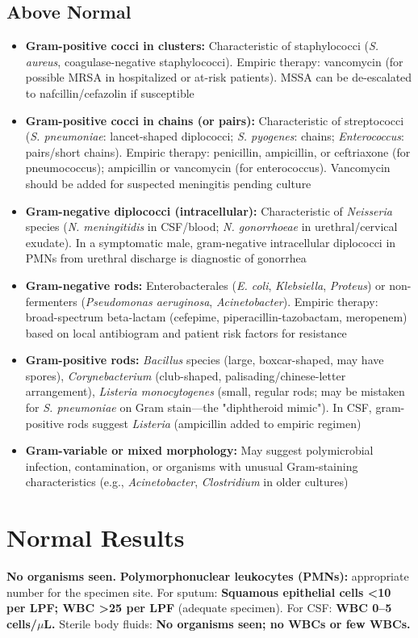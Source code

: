 \subsection*{Above Normal}
\begin{itemize}
  \item \textbf{Gram-positive cocci in clusters:} Characteristic of staphylococci (\textit{S. aureus}, coagulase-negative staphylococci). Empiric therapy: vancomycin (for possible MRSA in hospitalized or at-risk patients). MSSA can be de-escalated to nafcillin/cefazolin if susceptible
  \item \textbf{Gram-positive cocci in chains (or pairs):} Characteristic of streptococci (\textit{S. pneumoniae}: lancet-shaped diplococci; \textit{S. pyogenes}: chains; \textit{Enterococcus}: pairs/short chains). Empiric therapy: penicillin, ampicillin, or ceftriaxone (for pneumococcus); ampicillin or vancomycin (for enterococcus). Vancomycin should be added for suspected meningitis pending culture
  \item \textbf{Gram-negative diplococci (intracellular):} Characteristic of \textit{Neisseria} species (\textit{N. meningitidis} in CSF/blood; \textit{N. gonorrhoeae} in urethral/cervical exudate). In a symptomatic male, gram-negative intracellular diplococci in PMNs from urethral discharge is diagnostic of gonorrhea
  \item \textbf{Gram-negative rods:} Enterobacterales (\textit{E. coli}, \textit{Klebsiella}, \textit{Proteus}) or non-fermenters (\textit{Pseudomonas aeruginosa}, \textit{Acinetobacter}). Empiric therapy: broad-spectrum beta-lactam (cefepime, piperacillin-tazobactam, meropenem) based on local antibiogram and patient risk factors for resistance
  \item \textbf{Gram-positive rods:} \textit{Bacillus} species (large, boxcar-shaped, may have spores), \textit{Corynebacterium} (club-shaped, palisading/chinese-letter arrangement), \textit{Listeria monocytogenes} (small, regular rods; may be mistaken for \textit{S. pneumoniae} on Gram stain---the "diphtheroid mimic"). In CSF, gram-positive rods suggest \textit{Listeria} (ampicillin added to empiric regimen)
  \item \textbf{Gram-variable or mixed morphology:} May suggest polymicrobial infection, contamination, or organisms with unusual Gram-staining characteristics (e.g., \textit{Acinetobacter}, \textit{Clostridium} in older cultures)
\end{itemize}

\section*{Normal Results}
\textbf{No organisms seen.} \textbf{Polymorphonuclear leukocytes (PMNs):} appropriate number for the specimen site. For sputum: \textbf{Squamous epithelial cells <10 per LPF; WBC >25 per LPF} (adequate specimen). For CSF: \textbf{WBC 0--5 cells/$\mu$L.} Sterile body fluids: \textbf{No organisms seen; no WBCs or few WBCs.}

